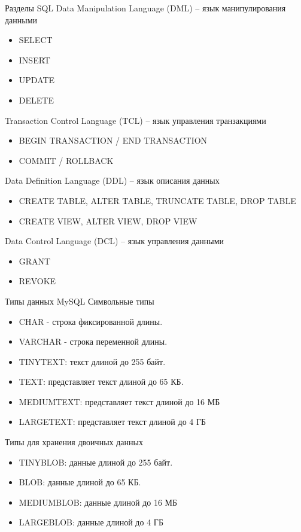\documentclass{beamer}
\begin{document}
\begin{frame}{Разделы SQL}
	Data Manipulation Language (DML) – язык манипулирования данными
	\begin{itemize}
		\item SELECT
		\item INSERT
		\item UPDATE
		\item DELETE
	\end{itemize}
	Transaction Control Language (TCL) – язык управления транзакциями
	\begin{itemize}
		\item BEGIN TRANSACTION / END TRANSACTION
		\item COMMIT / ROLLBACK
	\end{itemize}
	Data Definition Language (DDL) – язык описания данных
	\begin{itemize}
		\item CREATE TABLE, ALTER TABLE, TRUNCATE TABLE, DROP TABLE
		\item CREATE VIEW, ALTER VIEW, DROP VIEW
	\end{itemize}
	Data Control Language (DCL) – язык управления данными
	\begin{itemize}
		\item GRANT
		\item REVOKE
	\end{itemize}
\end{frame}

\begin{frame}{Типы данных MySQL}
	Символьные типы
	\begin{itemize}
		\item CHAR - строка фиксированной длины.
		\item VARCHAR - строка переменной длины.
		\item TINYTEXT: текст длиной до 255 байт.
		\item TEXT: представляет текст длиной до 65 КБ.
		\item MEDIUMTEXT: представляет текст длиной до 16 МБ
		\item LARGETEXT: представляет текст длиной до 4 ГБ
	\end{itemize}
	Типы для хранения двоичных данных
	\begin{itemize}
		\item TINYBLOB: данные длиной до 255 байт.
		\item BLOB: данные длиной до 65 КБ.
		\item MEDIUMBLOB: данные длиной до 16 МБ
		\item LARGEBLOB: данные длиной до 4 ГБ
	\end{itemize}
\end{frame}
\end{document}
